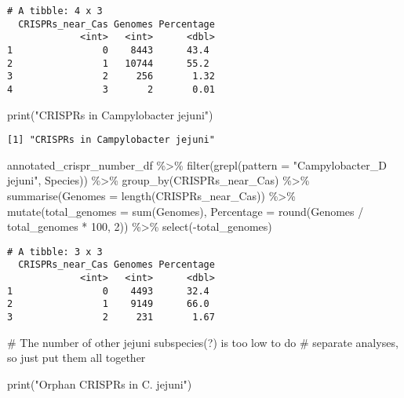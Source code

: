 \documentclass[
  twocolumn,
  landscape]{report}
\newenvironment{Shaded}{}{}
\newcommand{\AttributeTok}[1]{\textcolor[rgb]{0.84,0.23,0.29}{#1}}
\newcommand{\CommentTok}[1]{\textcolor[rgb]{0.42,0.45,0.49}{#1}}
\newcommand{\DecValTok}[1]{\textcolor[rgb]{0.00,0.36,0.77}{#1}}
\newcommand{\FunctionTok}[1]{\textcolor[rgb]{0.44,0.26,0.76}{#1}}
\newcommand{\NormalTok}[1]{\textcolor[rgb]{0.14,0.16,0.18}{#1}}
\newcommand{\SpecialCharTok}[1]{\textcolor[rgb]{0.00,0.36,0.77}{#1}}
\newcommand{\StringTok}[1]{\textcolor[rgb]{0.01,0.18,0.38}{#1}}
\begin{document}
\begin{verbatim}
# A tibble: 4 x 3
  CRISPRs_near_Cas Genomes Percentage
             <int>   <int>      <dbl>
1                0    8443      43.4 
2                1   10744      55.2 
3                2     256       1.32
4                3       2       0.01
\end{verbatim}

\begin{Shaded}
\begin{Highlighting}[]
\FunctionTok{print}\NormalTok{(}\StringTok{"CRISPRs in Campylobacter jejuni"}\NormalTok{)}
\end{Highlighting}
\end{Shaded}

\begin{verbatim}
[1] "CRISPRs in Campylobacter jejuni"
\end{verbatim}

\begin{Shaded}
\begin{Highlighting}[]
\NormalTok{annotated\_crispr\_number\_df }\SpecialCharTok{\%\textgreater{}\%}
  \FunctionTok{filter}\NormalTok{(}\FunctionTok{grepl}\NormalTok{(}\AttributeTok{pattern =} \StringTok{"Campylobacter\_D jejuni"}\NormalTok{, Species)) }\SpecialCharTok{\%\textgreater{}\%}
  \FunctionTok{group\_by}\NormalTok{(CRISPRs\_near\_Cas) }\SpecialCharTok{\%\textgreater{}\%}
  \FunctionTok{summarise}\NormalTok{(}\AttributeTok{Genomes =} \FunctionTok{length}\NormalTok{(CRISPRs\_near\_Cas)) }\SpecialCharTok{\%\textgreater{}\%}
  \FunctionTok{mutate}\NormalTok{(}\AttributeTok{total\_genomes =} \FunctionTok{sum}\NormalTok{(Genomes),}
         \AttributeTok{Percentage =} \FunctionTok{round}\NormalTok{(Genomes }\SpecialCharTok{/}\NormalTok{ total\_genomes }\SpecialCharTok{*} \DecValTok{100}\NormalTok{, }\DecValTok{2}\NormalTok{)) }\SpecialCharTok{\%\textgreater{}\%}
  \FunctionTok{select}\NormalTok{(}\SpecialCharTok{{-}}\NormalTok{total\_genomes)}
\end{Highlighting}
\end{Shaded}

\begin{verbatim}
# A tibble: 3 x 3
  CRISPRs_near_Cas Genomes Percentage
             <int>   <int>      <dbl>
1                0    4493      32.4 
2                1    9149      66.0 
3                2     231       1.67
\end{verbatim}

\begin{Shaded}
\begin{Highlighting}[]
\CommentTok{\# The number of other jejuni subspecies(?) is too low to do}
\CommentTok{\# separate analyses, so just put them all together}

\FunctionTok{print}\NormalTok{(}\StringTok{"Orphan CRISPRs in C. jejuni"}\NormalTok{)}
\end{Highlighting}
\end{Shaded}
\end{document}
